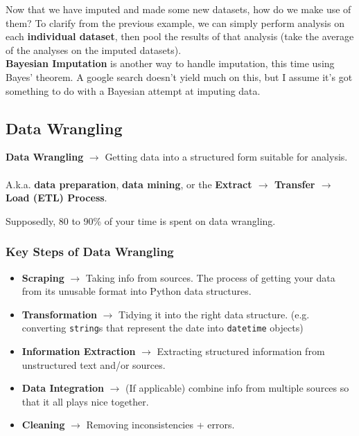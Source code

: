 \documentclass[english, 10pt]{article}
\begin{document}
Now that we have imputed and made some new datasets, how do we make use of them? To clarify from the previous example, we can simply perform analysis on each \textbf{individual dataset}, then pool the results of that analysis (take the average of the analyses on the imputed datasets).\\

\textbf{Bayesian Imputation} is another way to handle imputation, this time using Bayes' theorem. A google search doesn't yield much on this, but I assume it's got something to do with a Bayesian attempt at imputing data.\\

\subsection{Data Wrangling}

\begin{tcolorbox}[title=Definition:,colframe=red!75!black,colback=red!5!white,arc=0pt,fonttitle=\bfseries]
\textbf{Data Wrangling} $\rightarrow$ Getting data into a structured form suitable for analysis.\\\\ A.k.a. \textbf{data preparation}, \textbf{data mining}, or the \textbf{Extract $\rightarrow$ Transfer $\rightarrow$ Load (ETL) Process}.
\end{tcolorbox}

\hfill \break Supposedly, 80 to 90\% of your time is spent on data wrangling.

\subsubsection{Key Steps of Data Wrangling}

\begin{itemize}
	\item \textbf{Scraping} $\rightarrow$ Taking info from sources. The process of getting your data from its unusable format into Python data structures.
	\item \textbf{Transformation} $\rightarrow$ Tidying it into the right data structure. (e.g. converting \texttt{string}s that represent the date into \texttt{datetime} objects)
	\item \textbf{Information Extraction} $\rightarrow$ Extracting structured information from unstructured text and/or sources.
	\item \textbf{Data Integration} $\rightarrow$ (If applicable) combine info from multiple sources so that it all plays nice together.
	\item \textbf{Cleaning} $\rightarrow$ Removing inconsistencies + errors.
\end{itemize}
\end{document}
